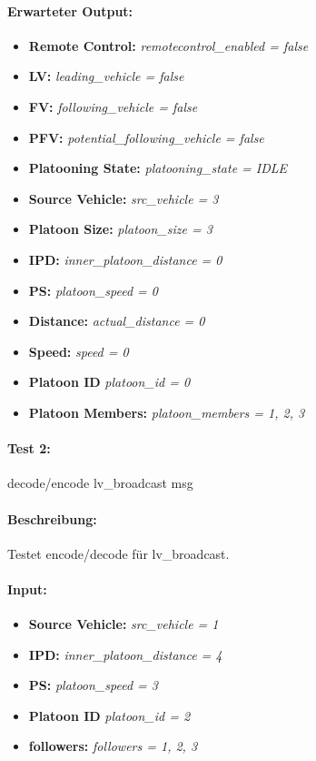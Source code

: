 \documentclass[a4paper, 12pt, titlepage]{scrartcl}
\begin{document}
{			\paragraph{Erwarteter Output:}
			\begin{itemize} \itemsep-0.5em
				\item \textbf{Remote Control:} \emph{remotecontrol\_enabled = false}
				\item \textbf{LV:} \emph{leading\_vehicle = false}
				\item \textbf{FV:} \emph{following\_vehicle = false}
				\item \textbf{PFV:} \emph{potential\_following\_vehicle = false}
				\item \textbf{Platooning State:} \emph{platooning\_state = IDLE}
				\item \textbf{Source Vehicle:} \emph{src\_vehicle = 3}
				\item \textbf{Platoon Size:} \emph{platoon\_size = 3}
				\item \textbf{IPD:} \emph{inner\_platoon\_distance = 0}
				\item \textbf{PS:} \emph{platoon\_speed = 0}
				\item \textbf{Distance:} \emph{actual\_distance = 0}
				\item \textbf{Speed:} \emph{speed = 0}
				\item \textbf{Platoon ID} \emph{platoon\_id = 0}
				\item \textbf{Platoon Members:} \emph{platoon\_members = {1, 2, 3}}
			\end{itemize}
			
			\paragraph{Test 2:}{decode/encode lv\_broadcast msg}
			\paragraph{Beschreibung:} Testet encode/decode für lv\_broadcast.
			\paragraph{Input:}
			\begin{itemize} \itemsep-0.5em
				\item \textbf{Source Vehicle:} \emph{src\_vehicle = 1}
				\item \textbf{IPD:} \emph{inner\_platoon\_distance = 4}
				\item \textbf{PS:} \emph{platoon\_speed = 3}
				\item \textbf{Platoon ID} \emph{platoon\_id = 2}
				\item \textbf{followers:} \emph{followers = {1, 2, 3}}
			\end{itemize}
}
\end{document}

